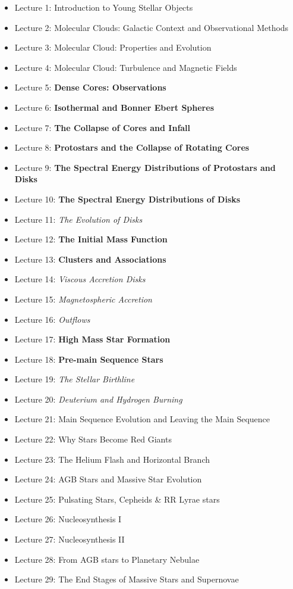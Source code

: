 \documentclass[11pt]{article}
\begin{document}
\begin{itemize}
 \item Lecture 1: Introduction to Young Stellar Objects
 \item Lecture 2: Molecular Clouds: Galactic Context and Observational Methods
 \item Lecture 3: Molecular Cloud: Properties and Evolution
 \item Lecture 4: Molecular Cloud: Turbulence and Magnetic Fields
 \item Lecture 5: \textbf{Dense Cores: Observations}
 \item Lecture 6: \textbf{Isothermal and Bonner Ebert Spheres}
 \item Lecture 7: \textbf{The Collapse of Cores and Infall}
 \item Lecture 8: \textbf{Protostars and the Collapse of Rotating Cores}
 \item Lecture 9: \textbf{The Spectral Energy Distributions of Protostars and Disks}
 \item Lecture 10: \textbf{The Spectral Energy Distributions of Disks}
 \item Lecture 11: \textit{The Evolution of Disks}
 \item Lecture 12: \textbf{The Initial Mass Function}
 \item Lecture 13: \textbf{Clusters and Associations}
 \item Lecture 14: \textit{Viscous Accretion Disks}
 \item Lecture 15: \textit{Magnetospheric Accretion}
 \item Lecture 16: \textit{Outflows}
 \item Lecture 17: \textbf{High Mass Star Formation}
 \item Lecture 18: \textbf{Pre-main Sequence Stars}
 \item Lecture 19: \textit{The Stellar Birthline}
 \item Lecture 20: \textit{Deuterium and Hydrogen Burning}
 \item Lecture 21: Main Sequence Evolution and Leaving the Main Sequence
 \item Lecture 22: Why Stars Become Red Giants
 \item Lecture 23: The Helium Flash and Horizontal Branch
 \item Lecture 24: AGB Stars and Massive Star Evolution
 \item Lecture 25: Pulsating Stars, Cepheids \& RR Lyrae stars
 \item Lecture 26: Nucleosynthesis I
 \item Lecture 27: Nucleosynthesis II
 \item Lecture 28: From AGB stars to Planetary Nebulae
 \item Lecture 29: The End Stages of Massive Stars and Supernovae
\end{itemize}
\end{document}
